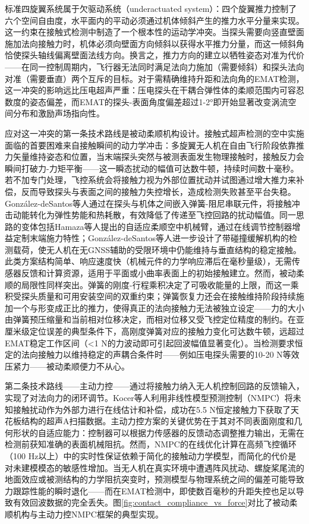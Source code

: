 标准四旋翼系统属于欠驱动系统（underactuated system）：四个旋翼推力控制了六个空间自由度，水平面内的平动必须通过机体倾斜产生的推力水平分量来实现。这一约束在接触式检测中制造了一个根本性的运动学冲突。当探头需要向竖直壁面施加法向接触力时，机体必须向壁面方向倾斜以获得水平推力分量，而这一倾斜角恰使探头轴线偏离壁面法线方向。换言之，推力方向的建立以牺牲姿态对准为代价——在同一控制周期内，飞行器无法同时满足法向力施加（需要倾斜）和探头法向对准（需要垂直）两个互斥的目标。对于需精确维持升距和法向角的EMAT检测，这一冲突的影响远比压电超声严重：压电探头在干耦合弹性体的柔顺范围内可容忍数度的姿态偏差，而EMAT的探头-表面角度偏差超过1-2°即开始显著改变涡流空间分布和激励声场指向性。

应对这一冲突的第一条技术路线是被动柔顺机构设计。接触式超声检测的空中实施面临的首要困难来自接触瞬间的动力学冲击：多旋翼无人机在自由飞行阶段依靠推力矢量维持姿态和位置，当末端探头突然与被测表面发生物理接触时，接触反力会瞬间打破力-力矩平衡——这一瞬态扰动的幅值可达数牛顿，持续时间数十毫秒。若不加专门处理，飞控系统会将接触力视为外部位置扰动并试图通过增大推力来补偿，反而导致探头与表面之间的接触力失控增长，造成检测失败甚至平台失稳。Gonz\'{a}lez-deSantos等人通过在探头与机体之间嵌入弹簧-阻尼串联元件，将接触冲击动能转化为弹性势能和热耗散，有效降低了传递至飞控回路的扰动幅值。同一思路的变体包括Hamaza等人提出的自适应柔顺空中机械臂，通过在线调节控制器增益定制末端施力特性；Gonz\'{a}lez-deSantos等人进一步设计了带碰撞缓解机构的检测载荷，使无人机在无GNSS辅助的受限环境中仍能维持与垂直结构的稳定接触。此类方案结构简单、响应速度快（机械元件的力学响应滞后在毫秒量级），无需传感器反馈和计算资源，适用于平面或小曲率表面上的初始接触建立。然而，被动柔顺的局限性同样突出。弹簧的刚度-行程乘积决定了可吸收能量的上限，而这一乘积受探头质量和可用安装空间的双重约束；弹簧恢复力还会在接触维持阶段持续施加一个与形变成正比的推力，使得真正的法向接触力无法被独立设定——力的大小由弹簧预压缩量和当前相对位移决定，而相对位移又受飞控定位精度的制约。在亚厘米级定位误差的典型条件下，高刚度弹簧对应的接触力变化可达数牛顿，远超过EMAT稳定工作区间（<1 N的力波动即可引起回波幅值显著变化）。当检测要求恒定的法向接触力以维持稳定的声耦合条件时——例如压电探头需要的10-20 N等效压紧力——被动柔顺便力不从心。

第二条技术路线——主动力控——通过将接触力纳入无人机控制回路的反馈输入，实现了对法向力的闭环调节。Kocer等人利用非线性模型预测控制（NMPC）将未知接触扰动作为外部力进行在线估计和补偿，成功在5.5 N恒定接触力下获取了天花板结构的超声A扫描数据。主动力控方案的关键优势在于其对不同表面刚度和几何形状的自适应能力：控制器可以根据力传感器的反馈动态调整推力输出，无需在检测前获知准确的表面机械阻抗。然而，NMPC的在线优化计算在高频飞控循环（100 Hz以上）中的实时性保证依赖于简化的接触动力学模型，而简化的代价是对未建模模态的敏感性增加。当无人机在真实环境中遭遇阵风扰动、螺旋桨尾流的地面效应或被测结构的力学阻抗突变时，预测模型与物理系统之间的偏差可能导致力跟踪性能的瞬时退化——而在EMAT检测中，即使数百毫秒的升距失控也足以导致有效回波数据的完全丢失。图\ref{fig:contact_compliance_vs_force}对比了被动柔顺机构与主动力控NMPC框架的典型实现。

